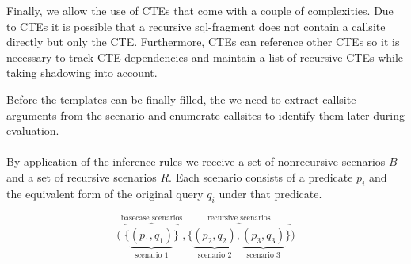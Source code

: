 Finally, we allow the use of CTEs that come with a couple of complexities. Due to CTEs it is possible that a recursive sql-fragment does not contain a callsite directly but only the CTE. Furthermore, CTEs can reference other CTEs so it is necessary to track CTE-dependencies and maintain a list of recursive CTEs while taking shadowing into account.

Before the templates can be finally filled, the we need to extract callsite-arguments from the scenario and enumerate callsites to identify them later during evaluation.
\\
\\
By application of the inference rules we receive a set of nonrecursive scenarios $B$ and a set of recursive scenarios $R$. Each scenario consists of a predicate $p_i$ and the equivalent form of the original query $q_i$ under that predicate.

$$
\Big(
    \overbrace{\big\{
        \underbrace{
            (p_1, q_1)
        }_{\text{scenario 1}}
    \big\}}^{\text{basecase scenarios}}
    ,
    \overbrace{\big\{
        \underbrace{
            (p_2, q_2)
        }_{\text{scenario 2}},
        \underbrace{
            (p_3, q_3)
        }_{\text{scenario 3}}
    \big\}}^{\text{recursive scenarios}}
\Big)
$$



